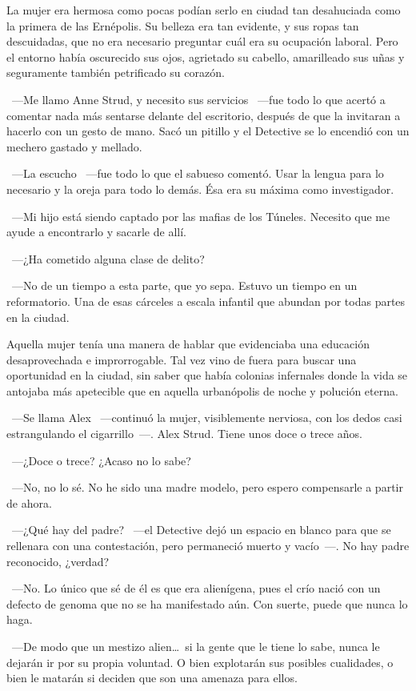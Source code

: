 La mujer era hermosa como pocas podían serlo en ciudad tan desahuciada como la primera de las Ernépolis. Su belleza era tan evidente, y sus ropas tan descuidadas, que no era necesario preguntar cuál era su ocupación laboral. Pero el entorno había oscurecido sus ojos, agrietado su cabello, amarilleado sus uñas y seguramente también petrificado su corazón.

~---Me llamo Anne Strud, y necesito sus servicios ~---fue todo lo que acertó a comentar nada más sentarse delante del escritorio, después de que la invitaran a hacerlo con un gesto de mano. Sacó un pitillo y el Detective se lo encendió con un mechero gastado y mellado.

~---La escucho ~---fue todo lo que el sabueso comentó. Usar la lengua para lo necesario y la oreja para todo lo demás. Ésa era su máxima como investigador.

~---Mi hijo está siendo captado por las mafias de los Túneles. Necesito que me ayude a encontrarlo y sacarle de allí.

~---¿Ha cometido alguna clase de delito?

~---No de un tiempo a esta parte, que yo sepa. Estuvo un tiempo en un reformatorio. Una de esas cárceles a escala infantil que abundan por todas partes en la ciudad.

Aquella mujer tenía una manera de hablar que evidenciaba una educación desaprovechada e improrrogable. Tal vez vino de fuera para buscar una oportunidad en la ciudad, sin saber que había colonias infernales donde la vida se antojaba más apetecible que en aquella urbanópolis de noche y polución eterna.

~---Se llama Alex ~---continuó la mujer, visiblemente nerviosa, con los dedos casi estrangulando el cigarrillo~---. Alex Strud. Tiene unos doce o trece años.

~---¿Doce o trece? ¿Acaso no lo sabe?

~---No, no lo sé. No he sido una madre modelo, pero espero compensarle a partir de ahora.

~---¿Qué hay del padre? ~---el Detective dejó un espacio en blanco para que se rellenara con una contestación, pero permaneció muerto y vacío~---. No hay padre reconocido, ¿verdad?

~---No. Lo único que sé de él es que era alienígena, pues el crío nació con un defecto de genoma que no se ha manifestado aún. Con suerte, puede que nunca lo haga.

~---De modo que un mestizo alien\dots\ si la gente que le tiene lo sabe, nunca le dejarán ir por su propia voluntad. O bien explotarán sus posibles cualidades, o bien le matarán si deciden que son una amenaza para ellos.

